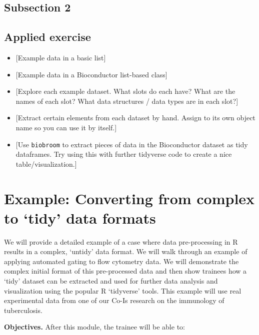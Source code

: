 \documentclass[]{tufte-book}
\providecommand{\tightlist}{%
  \setlength{\itemsep}{0pt}\setlength{\parskip}{0pt}}
\begin{document}
\hypertarget{subsection-2}{%
\subsection{Subsection 2}\label{subsection-2}}

\hypertarget{applied-exercise}{%
\subsection{Applied exercise}\label{applied-exercise}}

\begin{itemize}
\tightlist
\item
  {[}Example data in a basic list{]}
\item
  {[}Example data in a Bioconductor list-based class{]}
\item
  {[}Explore each example dataset. What slots do each have? What are the names of each slot?
  What data structures / data types are in each slot?{]}
\item
  {[}Extract certain elements from each dataset by hand. Assign to its own object name so
  you can use it by itself.{]}
\item
  {[}Use \texttt{biobroom} to extract pieces of data in the Bioconductor dataset as tidy dataframes.
  Try using this with further tidyverse code to create a nice table/visualization.{]}
\end{itemize}

\hypertarget{example-converting-from-complex-to-tidy-data-formats}{%
\section{Example: Converting from complex to `tidy' data formats}\label{example-converting-from-complex-to-tidy-data-formats}}

We will provide a detailed example of a case where data pre-processing in R
results in a complex, `untidy' data format. We will walk through an example of
applying automated gating to flow cytometry data. We will demonstrate the
complex initial format of this pre-processed data and then show trainees how a
`tidy' dataset can be extracted and used for further data analysis and
visualization using the popular R `tidyverse' tools. This example will use real
experimental data from one of our Co-Is research on the immunology of
tuberculosis.

\textbf{Objectives.} After this module, the trainee will be able to:
\end{document}
